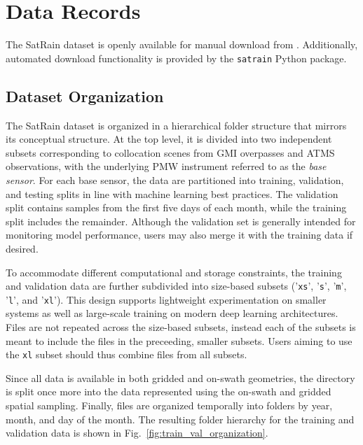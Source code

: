 \documentclass[11pt]{article}
\begin{document}
\section{Data Records}

The SatRain dataset is openly available for manual download from
\citep{SatRain2025}. Additionally, automated download functionality is provided
by the \texttt{satrain} \citep{SatRainPython2025} Python package.


\subsection{Dataset Organization}

The SatRain dataset is organized in a hierarchical folder structure that mirrors
its conceptual structure. At the top level, it is divided into two independent
subsets corresponding to collocation scenes from GMI overpasses and ATMS
observations, with the underlying PMW instrument referred to as the \textit{base sensor}.
For each base sensor, the data are partitioned into training, validation, and
testing splits in line with machine learning best practices. The validation
split contains samples from the first five days of each month, while the
training split includes the remainder. Although the validation set is generally
intended for monitoring model performance, users may also merge it with the
training data if desired.

To accommodate different computational and storage constraints, the training and
validation data are further subdivided into size-based subsets ('\texttt{xs}',
'\texttt{s}', '\texttt{m}', '\texttt{l}', and '\texttt{xl}'). This design
supports lightweight experimentation on smaller systems as well as large-scale
training on modern deep learning architectures. Files are not repeated across
the size-based subsets, instead each of the subsets is meant to include the
files in the preceeding, smaller subsets. Users aiming to use the \texttt{xl}
subset should thus combine files from all subsets.

Since all data is available in both gridded and on-swath geometries, the
directory is split once more into the data represented using the on-swath and
gridded spatial sampling. Finally, files are organized temporally into folders
by year, month, and day of the month. The resulting folder hierarchy for the
training and validation data is shown in Fig.~\ref{fig:train_val_organization}.
\end{document}
